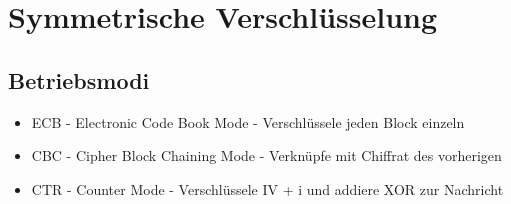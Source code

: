 \section{Symmetrische Verschlüsselung}%
\label{sv:sec:symmetrische-verschluesselung}

\subsection{Betriebsmodi}%
\label{sv:sub:betriebsmodi}
\begin{itemize}
\item ECB - Electronic Code Book Mode - Verschlüssele jeden Block einzeln
\item CBC - Cipher Block Chaining Mode - Verknüpfe mit Chiffrat des vorherigen
\item CTR - Counter Mode - Verschlüssele IV + i und addiere XOR zur Nachricht
\end{itemize}
